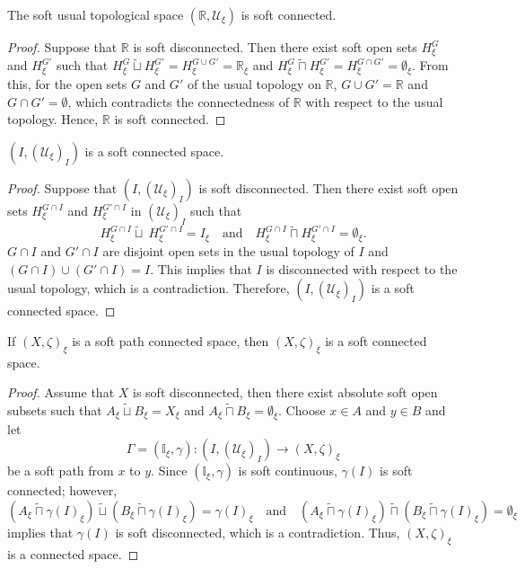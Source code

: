 \documentclass[preprint,12pt]{elsarticle}
\begin{document}
 \begin{prop}
 The soft usual topological space  $(\mathbb{R},\mathscr{U}_\xi)$  is soft connected.
 \end{prop}
 \begin{proof}
 Suppose that $\mathbb{R}$ is soft disconnected. Then there exist soft open sets $H^G_\xi$ and $H^{G'}_\xi$ such that $H^G_\xi\widetilde{\sqcup}H^{G'}_\xi= H^{G\cup G'}_\xi=\mathbb{R}_\xi$ and $H^G_\xi\widetilde{\sqcap}H^{G'}_\xi =H^{G\cap G'}_\xi=\emptyset_\xi$. From this, for the open sets $G$ and $G'$ of the usual topology on $\mathbb{R}$, $G\cup G'=\mathbb{R}$ and $G\cap G'=\emptyset$, which contradicts the connectedness of $\mathbb{R}$ with respect to the usual topology. Hence, $\mathbb{R}$ is soft connected.

 \end{proof}



 \begin{prop}
 $(I,(\mathscr{U}_\xi)_I)$ is a soft connected space.
\end{prop}

\begin{proof}
Suppose that $(I,(\mathscr{U}_\xi)_I)$  is soft disconnected. Then there exist  soft open sets $H^{G\cap I}_\xi$ and $H^{G'\cap I}_\xi$ in $(\mathscr{U}_\xi)_I$ such that
\[
H^{G\cap I}_\xi \widetilde{\sqcup}\ H^{G'\cap I}_\xi=I_\xi\quad \text{and} \quad H^{G\cap I}_\xi\widetilde{\sqcap} H^{G'\cap I}_\xi=\emptyset_\xi.
\]
$G\cap I$ and $G'\cap I$ are disjoint open sets in the usual topology of $I$ and $(G\cap I)\cup (G'\cap I) = I$.
This implies that $I$ is disconnected with respect to the usual topology, which is a contradiction. Therefore, $(I,(\mathscr{U}_\xi)_I)$ is a soft connected space.


\end{proof}


\begin{thm}
If $(X,\zeta)_\xi$ is a soft path connected space, then $(X,\zeta)_\xi$ is a soft connected space.
\end{thm}

\begin{proof}
Assume that $X$ is soft disconnected, then there exist absolute soft open subsets such that  \(
 A_\xi \widetilde{\sqcup} B_\xi=X_\xi \) and  \(A_\xi\widetilde{\sqcap} B_\xi=\emptyset_\xi\).
 Choose $x\in A$ and $y\in B$  and let \[
\Gamma=(\mathbb{I}_\xi, \gamma) :(I,(\mathscr{U}_\xi)_I)\to (X,\zeta)_\xi
\] be a soft path from $x$ to $y$. Since $(\mathbb{I}_\xi, \gamma)$ is soft continuous, $\gamma(I)$ is soft connected; however, $$(A_\xi\widetilde{\sqcap}\gamma(I)_\xi)\widetilde{\sqcup}(B_\xi\widetilde{\sqcap}\gamma(I)_\xi)=\gamma(I)_\xi \quad \text{and} \quad (A_\xi\widetilde{\sqcap}\gamma(I)_\xi)\widetilde{\sqcap}(B_\xi\widetilde{\sqcap}\gamma(I)_\xi)=\emptyset_\xi $$ implies that $\gamma(I)$ is soft disconnected, which is a contradiction. Thus,
$(X,\zeta)_\xi$ is a  connected space.
\end{proof}
\end{document}
